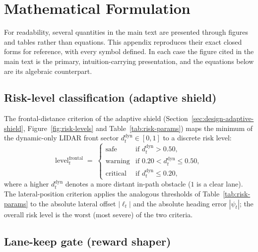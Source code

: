 
\chapter{Mathematical Formulation}\label{app:math}

For readability, several quantities in the main text are presented through figures and tables
rather than equations. This appendix reproduces their exact closed forms for reference, with every
symbol defined. In each case the figure cited in the main text is the primary, intuition-carrying
presentation, and the equations below are its algebraic counterpart.

\section{Risk-level classification (adaptive shield)}\label{app:math-risk}

The frontal-distance criterion of the adaptive shield (Section~\ref{sec:design-adaptive-shield},
Figure~\ref{fig:risk-levels} and Table~\ref{tab:risk-params}) maps the minimum of the dynamic-only
LIDAR front sector \(d^{\mathrm{dyn}}_t\in[0,1]\) to a discrete risk level:
\begin{equation}
  \mathrm{level}^{\mathrm{frontal}}_t \;=\;
     \begin{cases}
       \mathrm{safe}     & \text{if } d^{\mathrm{dyn}}_t > 0.50,\\
       \mathrm{warning}  & \text{if } 0.20 < d^{\mathrm{dyn}}_t \leq 0.50,\\
       \mathrm{critical} & \text{if } d^{\mathrm{dyn}}_t \leq 0.20,
     \end{cases}
  \label{eq:shield-risk-front}
\end{equation}
where a higher \(d^{\mathrm{dyn}}_t\) denotes a more distant in-path obstacle (\(1\) is a clear
lane). The lateral-position criterion applies the analogous thresholds of
Table~\ref{tab:risk-params} to the absolute lateral offset \(|\ell_t|\) and the absolute heading
error \(|\psi_t|\); the overall risk level is the worst (most severe) of the two criteria.

\section{Lane-keep gate (reward shaper)}\label{app:math-gate}

